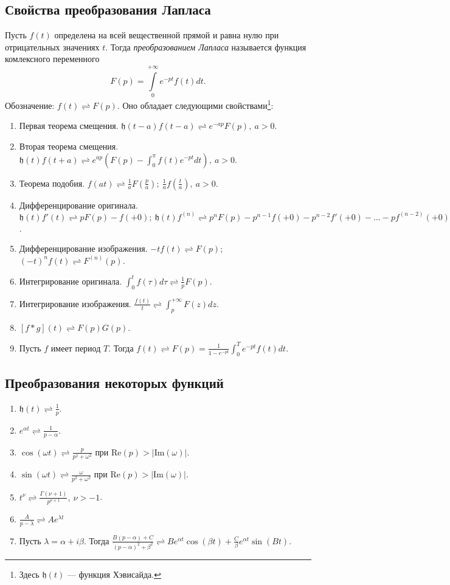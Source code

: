 \documentclass[a4paper,12pt]{scrartcl}
\begin{document}
\subsection{Свойства преобразования Лапласа}
Пусть $f(t)$ определена на всей вещественной прямой и равна нулю при отрицательных значениях $t$. Тогда \textit{преобразованием Лапласа} называется функция комлексного переменного
$$
F(p) = \int\limits_0^{+\infty}e^{-pt}f(t)dt.
$$
Обозначение: $f(t) \rightleftharpoons F(p).$ Оно обладает следующими свойствами\footnote{Здесь ${\mathfrak h}(t)$ --- функция Хэвисайда.}:
\begin{enumerate}
 \item Первая теорема смещения. $\mathfrak{h}(t-a)f(t-a) \rightleftharpoons e^{-ap}F(p),\ a>0$.
 \item Вторая теорема смещения. $\mathfrak{h}(t)f(t+a) \rightleftharpoons e^{ap}\left(F(p) - \int_0^\pi f(t)e^{-pt}dt \right),\ a > 0$.
 \item Теорема подобия. $f(at) \rightleftharpoons \frac{1}{a}F\left(\frac{p}{a}\right);\ \frac{1}{a}f\left(\frac{t}{a}\right),\ a > 0$.
 \item Дифференцирование оригинала. $\mathfrak{h}(t)f'(t) \rightleftharpoons pF(p) - f(+0); \ \mathfrak{h}(t)f^{(n)} \rightleftharpoons p^nF(p) - p^{n-1}f(+0) - p^{n-2}f'(+0)-\ldots-pf^{(n-2)}(+0)- f^{n-1}(+0)$.	
 \item Дифференцирование изображения. $-tf(t) \rightleftharpoons F(p)$; $(-t)^nf(t) \rightleftharpoons F^{(n)}(p)$. 
 \item Интегрирование оригинала. $\int_0^t f(\tau)d\tau \rightleftharpoons \frac{1}{p}F(p)$.
 \item Интегрирование изображения. $\frac{f(t)}{t} \rightleftharpoons \int_p^{+\infty}F(z)dz$.
 \item $[f*g](t) \rightleftharpoons F(p)G(p)$.
 \item Пусть $f$ имеет период $T$. Тогда $f(t) \rightleftharpoons F(p) = \frac{1}{1-e^{-pt}}\int_0^T e^{-pt}f(t)dt$.
\end{enumerate}
\subsection{Преобразования некоторых функций}
\begin{enumerate}
 \item $\mathfrak{h}(t) \rightleftharpoons \frac{1}{p}$.
 \item $ e^{\alpha t} \rightleftharpoons \frac{1}{p-\alpha}$.
 \item $ \cos(\omega t) \rightleftharpoons \frac{p}{p^2 + \omega^2}$ при Re$(p) > |$Im$(\omega)|$.
 \item $ \sin(\omega t) \rightleftharpoons \frac{\omega}{p^2 + \omega^2}$ при Re$(p) > |$Im$( \omega)|$.
 \item $ t^\nu \rightleftharpoons \frac{\Gamma(\nu+1)}{p^{\nu+1}},\ \nu > -1$.
 \item $\frac{A}{p-\lambda} \rightleftharpoons Ae^{\lambda t}$
 \item Пусть $\lambda = \alpha + i\beta$. Тогда $\frac{B(p-\alpha) + C}{(p-\alpha)^2 + \beta^2} \rightleftharpoons Be^{\alpha t}\cos(\beta t) + \frac{C}{\beta}e^{\alpha t}\sin(Bt)$.
\end{enumerate}
\end{document}
